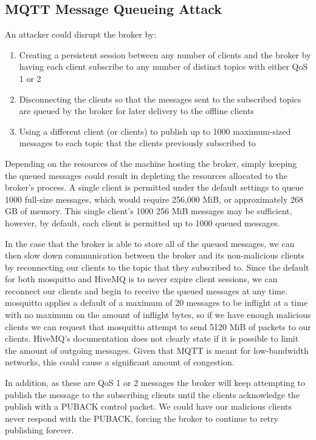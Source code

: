 \documentclass[12pt]{article}
\begin{document}
\subsection{MQTT Message Queueing Attack}
An attacker could disrupt the broker by:
\begin{enumerate}
	\item Creating a persistent session between any number of clients and the broker by having each client subscribe to any number of distinct topics with either QoS 1 or 2
	\item Disconnecting the clients so that the messages sent to the subscribed topics are queued by the broker for later delivery to the offline clients
	\item Using a different client (or clients) to publish up to 1000 maximum-sized messages to each topic that the clients previously subscribed to
\end{enumerate}
Depending on the resources of the machine hosting the broker, simply keeping the queued messages could result in depleting the resources allocated to the broker's process. A single client is permitted under the default settings to queue 1000 full-size messages, which would require 256,000 MiB, or approximately 268 GB of memory. This single client's 1000 256 MiB messages may be sufficient, however, by default, each client is permitted up to 1000 queued messages.\par
In the case that the broker is able to store all of the queued messages, we can then slow down communication between the broker and its non-malicious clients by reconnecting our clients to the topic that they subscribed to. Since the default for both mosquitto and HiveMQ is to never expire client sessions, we can reconnect our clients and begin to receive the queued messages at any time. mosquitto applies a default of a maximum of 20 messages to be inflight at a time with no maximum on the amount of inflight bytes, so if we have enough malicious clients we can request that mosquitto attempt to send 5120 MiB of packets to our clients. HiveMQ's documentation does not clearly state if it is possible to limit the amount of outgoing messages\cite{hivemq-bw}. Given that MQTT is meant for low-bandwidth networks, this could cause a significant amount of congestion.\par
In addition, as these are QoS 1 or 2 messages the broker will keep attempting to publish the message to the subscribing clients until the clients acknowledge the publish with a PUBACK control packet. We could have our malicious clients never respond with the PUBACK, forcing the broker to continue to retry publishing forever. 
\end{document}
